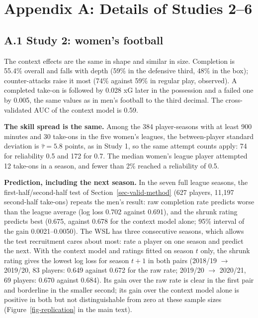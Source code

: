 \documentclass[
  12pt]{article}
\begin{document}
\renewcommand{\bibsection}{}


\section*{Appendix A: Details of Studies
2--6}\label{appendix-a-details-of-studies-26}

\subsection*{A.1 Study 2: women's football}\label{sec-women}

The context effects are the same in shape and similar in size.
Completion is 55.4\% overall and falls with depth (59\% in the defensive
third, 48\% in the box); counter-attacks raise it most (74\% against
59\% in regular play, observed). A completed take-on is followed by
0.028 xG later in the possession and a failed one by 0.005, the same
values as in men's football to the third decimal. The cross-validated
AUC of the context model is 0.59.

\textbf{The skill spread is the same.} Among the 384 player-seasons with
at least 900 minutes and 30 take-ons in the five women's leagues, the
between-player standard deviation is \(\hat\tau=5.8\) points, as in
Study 1, so the same attempt counts apply: 74 for reliability 0.5 and
172 for 0.7. The median women's league player attempted 12 take-ons in a
season, and fewer than 2\% reached a reliability of 0.5.

\textbf{Prediction, including the next season.} In the seven full league
seasons, the first-half/second-half test of
Section~\ref{sec-valid-method} (627 players, 11,197 second-half
take-ons) repeats the men's result: raw completion rate predicts worse
than the league average (log loss 0.702 against 0.691), and the shrunk
rating predicts best (0.675, against 0.678 for the context model alone;
95\% interval of the gain 0.0021--0.0050). The WSL has three consecutive
seasons, which allows the test recruitment cares about most: rate a
player on one season and predict the next. With the context model and
ratings fitted on season \(t\) only, the shrunk rating gives the lowest
log loss for season \(t+1\) in both pairs (2018/19 \(\rightarrow\)
2019/20, 83 players: 0.649 against 0.672 for the raw rate; 2019/20
\(\rightarrow\) 2020/21, 69 players: 0.670 against 0.684). Its gain over
the raw rate is clear in the first pair and borderline in the smaller
second; its gain over the context model alone is positive in both but
not distinguishable from zero at these sample sizes
(Figure~\ref{fig-replication} in the main text).
\end{document}
